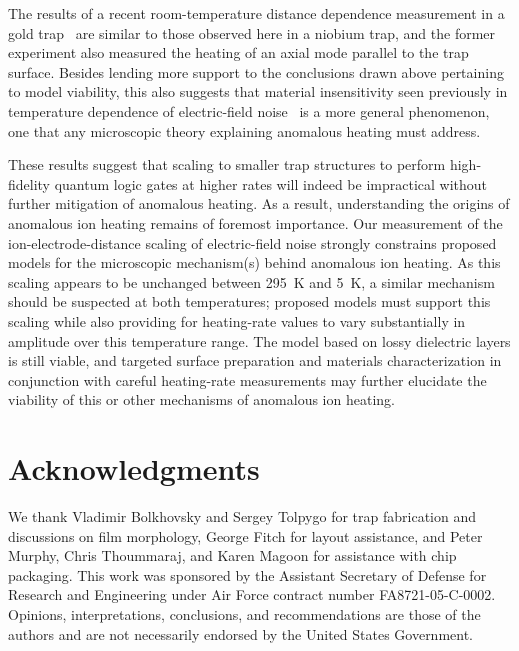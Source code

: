 \documentclass[reprint,twocolumn,prl,amsmath,amssymb,longbibliography,aps,superscriptaddress]{revtex4-1}
\begin{document}
The results of a recent room-temperature distance dependence measurement in a gold trap~\cite{wunderlich_arXiv_2017} are similar to those observed here in a niobium trap, and the former experiment also measured the heating of an axial mode parallel to the trap surface.  Besides lending more support to the conclusions drawn above pertaining to model viability, this also suggests that material insensitivity seen previously in temperature dependence of electric-field noise~\cite{Chiaverini2014} is a more general phenomenon, one that any microscopic theory explaining anomalous heating must address.

These results suggest that scaling to smaller trap structures to perform high-fidelity quantum logic gates at higher rates will indeed be impractical without further mitigation of anomalous heating.  As a result, understanding the origins of anomalous ion heating remains of foremost importance.  Our measurement of the ion-electrode-distance scaling of electric-field noise strongly constrains proposed models for the microscopic mechanism(s) behind anomalous ion heating.  As this scaling appears to be unchanged between 295~K and 5~K, a similar mechanism should be suspected at both temperatures; proposed models must support this scaling while also providing for heating-rate values to vary substantially in amplitude over this temperature range.  The model based on lossy dielectric layers is still viable, and targeted surface preparation and materials characterization in conjunction with careful heating-rate measurements may further elucidate the viability of this or other mechanisms of anomalous ion heating.



\section{Acknowledgments}
We thank Vladimir Bolkhovsky and Sergey Tolpygo for trap fabrication and discussions on film morphology, George Fitch for layout assistance, and Peter Murphy, Chris Thoummaraj, and Karen Magoon for assistance with chip packaging. This work was sponsored by the Assistant Secretary of Defense for Research and Engineering under Air Force contract number FA8721-05-C-0002. Opinions, interpretations, conclusions, and recommendations are those of the authors and are not necessarily endorsed by the United States Government.



\end{document}
